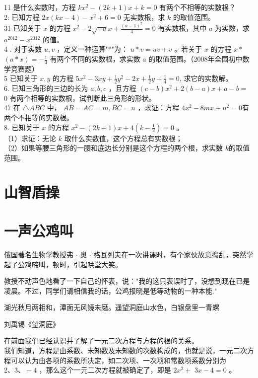 \documentclass[10pt]{article}
\begin{document}
11 是什么实数时，方程 $k x^{2}-(2 k+1) x+k=0$ 有两个不相等的实数根？\\
2: 已知方程 $2 x(k x-4)-x^{2}+6=0$ 无实数根，求 $k$ 的取值范围。\\
31 已知关于 $x$ 的方程 $x^{2}-2 \sqrt{-a} x+\frac{(a-1)^{2}}{4}=0$ 有实数根，其中 $a$ 为实数，求 $a^{2012}-x^{2012}$ 的值。\\
4 . 对于实数 $u, v$ ，定义一种运算"*"为： $u * v=u v+v$ 。若关于 $x$ 的方程 $x *$ $(a * x)=-\frac{1}{4}$ 有两个不同的实数根，求实数 $a$ 的取值范围。（2008年全国初中数学竞赛题）\\
5 已知关于 $x, y$ 的方程 $5 x^{2}-3 x y+\frac{1}{2} y^{2}-2 x+\frac{1}{2} y+\frac{1}{4}=0$, 求它的实数解。\\
6. 已知三角形的三边的长为 $a, b, c$ ，且方程 $(c-b) x^{2}+2(b-a) x+a-b=$ 0 有两个相等的实数根，试判断此三角形的形状。\\
47 在 $\triangle A B C$ 中， $A B=A C=m, B C=n$ ，求证：方程 $4 x^{2}-8 m x+n^{2}=0$有两个不相等的实数根。\\
8. 已知关于 $x$ 的方程 $x^{2}-(2 k+1) x+4\left(k-\frac{1}{2}\right)=0$ 。\\
（1）求证：无论 $k$ 取什么实数值，这个方程总有实数根；\\
（2）如果等腰三角形的一腰和底边长分别是这个方程的两个根，求实数 $k$的取值范围。

\section*{山智盾操}
\section*{一声公鸡叫}
俄国著名生物学教授弗 $\cdot$ 奥 $\cdot$ 格瓦列夫在一次讲课时，有个家伙故意捣乱，突然学起了公鸡啼叫，顿时，引起哄堂大笑。

教授不动声色地看了一下自己的怀表，说："我的这只表误时了，没想到现在已是凌晨。不过，同学们请相信我的话，公鸡报晓是低等动物的一种本能."

湖光秋月两相和，潭面无风镜未磨。遥望洞庭山水色，白银盘里一青螺

刘禹锡《望洞庭》

在前面我们已经认识并了解了一元二次方程与方程的根的关系。\\
我们知道，方程是由系数、未知数及未知数的次数构成的，也就是说，一元二次方程可以认为由各项的系数所决定，如二次项、一次项和常数项系数分别为 $2 、 3 、-4$ ，那么这个一元二次方程就被确定了，即是 $2 x^{2}+$ $3 x-4=0$ 。
\end{document}
